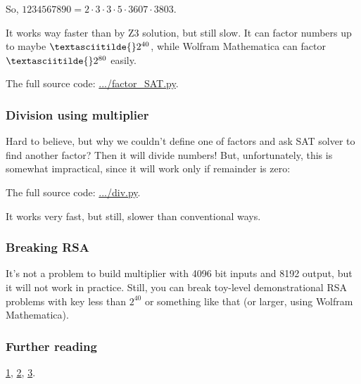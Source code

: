 So, $1234567890 = 2 \cdot 3 \cdot 3 \cdot 5 \cdot 3607 \cdot 3803$.

It works way faster than by Z3 solution, but still slow.
It can factor numbers up to maybe $\textasciitilde{}2^{40}$, while Wolfram Mathematica can factor
$\textasciitilde{}2^{80}$ easily.

The full source code: \url{.../factor_SAT.py}.

\subsubsection{Division using multiplier}

Hard to believe, but why we couldn't define one of factors and ask SAT solver to find another factor?
Then it will divide numbers!
But, unfortunately, this is somewhat impractical, since it will work only if remainder is zero:



The full source code: \url{.../div.py}.

It works very fast, but still, slower than conventional ways.

\subsubsection{Breaking \ac{RSA}}

It's not a problem to build multiplier with 4096 bit inputs and 8192 output, but it will not work in practice.
Still, you can break toy-level demonstrational RSA problems with key less than $2^{40}$ or something like that
(or larger, using Wolfram Mathematica).

\subsubsection{Further reading}

\href{https://yurichev.com/mirrors/SAT_factor/Encoding%20Basic%20Arithmetic%20Operations%20for%20SAT-Solvers.pdf}{1},
\href{https://yurichev.com/mirrors/SAT_factor/Factoring%20integers%20with%20parallel%20SAT%20solvers.pdf}{2},
\href{https://yurichev.com/mirrors/SAT_factor/Hard%20Instance%20Generation%20for%20SAT.pdf}{3}.

